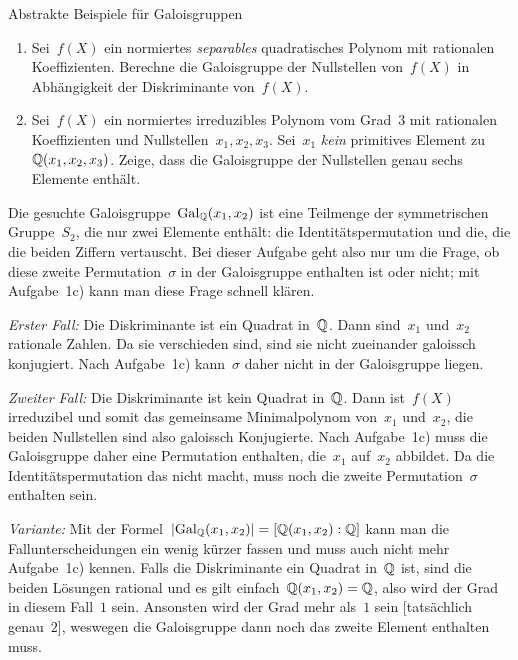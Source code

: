 \documentclass{algblatt}
\begin{document}
\begin{aufgabe}{Abstrakte Beispiele für Galoisgruppen}
\begin{enumerate}
\item Sei~$f(X)$ ein normiertes \emph{separables} quadratisches Polynom mit rationalen
Koeffizienten.
Berechne die Galoisgruppe der Nullstellen von~$f(X)$ in Abhängigkeit der Diskriminante
von~$f(X)$.

\item Sei~$f(X)$ ein normiertes irreduzibles Polynom vom Grad~$3$ mit
rationalen Koeffizienten und Nullstellen~$x_1,x_2,x_3$. Sei~$x_1$ \emph{kein}
primitives Element zu~$\mathbb{Q}(x_1,x_2,x_3)$. Zeige, dass die Galoisgruppe der
Nullstellen genau sechs Elemente enthält.
\end{enumerate}

\begin{loesungE}
\item Die gesuchte Galoisgruppe~$\mathrm{Gal}_{\mathbb{Q}}(x_1,x_2)$ ist eine Teilmenge der
symmetrischen Gruppe~$S_2$, die nur zwei Elemente enthält: die
Identitätspermutation und die, die die beiden Ziffern vertauscht. Bei dieser
Aufgabe geht also nur um die Frage, ob diese zweite Permutation~$\sigma$ in der
Galoisgruppe enthalten ist oder nicht; mit Aufgabe~1c) kann man diese Frage
schnell klären.

\emph{Erster Fall:} Die Diskriminante ist ein Quadrat in~$\mathbb{Q}$. Dann sind~$x_1$
und~$x_2$ rationale Zahlen. Da sie verschieden sind, sind sie nicht zueinander
galoissch konjugiert. Nach Aufgabe~1c) kann~$\sigma$ daher nicht in der
Galoisgruppe liegen.

\emph{Zweiter Fall:} Die Diskriminante ist kein Quadrat in~$\mathbb{Q}$. Dann
ist~$f(X)$ irreduzibel und somit das gemeinsame Minimalpolynom von~$x_1$
und~$x_2$, die beiden Nullstellen sind also galoissch Konjugierte. Nach
Aufgabe~1c) muss die Galoisgruppe daher eine Permutation enthalten, die~$x_1$
auf~$x_2$ abbildet. Da die Identitätspermutation das nicht macht, muss noch
die zweite Permutation~$\sigma$ enthalten sein.

\emph{Variante:} Mit der Formel~$|\mathrm{Gal}_{\mathbb{Q}}(x_1,x_2)| =
[\mathbb{Q}(x_1,x_2):\mathbb{Q}]$ kann man die Fallunterscheidungen ein wenig kürzer
fassen und muss auch nicht mehr Aufgabe~1c) kennen. Falls die Diskriminante ein
Quadrat in~$\mathbb{Q}$ ist, sind die beiden Lösungen rational und es gilt
einfach~$\mathbb{Q}(x_1,x_2) = \mathbb{Q}$, also wird der Grad in diesem Fall~$1$ sein.
Ansonsten wird der Grad mehr als~$1$ sein [tatsächlich genau~$2$], weswegen die
Galoisgruppe dann noch das zweite Element enthalten muss.


\end{loesungE}
\end{aufgabe}
\end{document}
